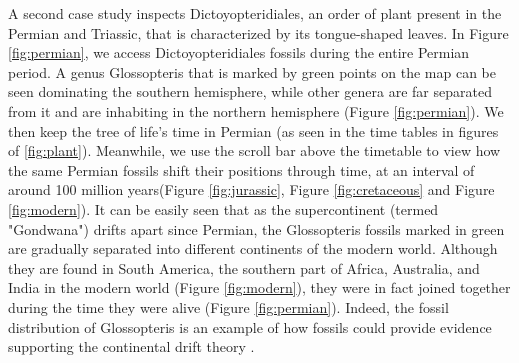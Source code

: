 \documentclass[11pt, a4paper,oneside,chapterprefix=false]{scrbook}
\begin{document}
A second case study inspects Dictoyopteridiales, an order of plant present in the Permian and Triassic, that is characterized by its tongue-shaped leaves. In Figure \ref{fig:permian}, we access Dictoyopteridiales fossils during the entire Permian period. A genus Glossopteris that is marked by green points on the map can be seen dominating the southern hemisphere, while other genera are far separated from it and are inhabiting in the northern hemisphere (Figure \ref{fig:permian}). We then keep the tree of life's time in Permian (as seen in the time tables in figures of \ref{fig:plant}). Meanwhile, we use the scroll bar above the timetable to view how the same Permian fossils shift their positions through time, at an interval of around 100 million years(Figure \ref{fig:jurassic}, Figure \ref{fig:cretaceous} and Figure \ref{fig:modern}). It can be easily seen that as the supercontinent (termed "Gondwana") drifts apart since Permian, the Glossopteris fossils marked in green are gradually separated into different continents of the modern world. Although they are found in South America, the southern part of Africa, Australia, and India in the modern world (Figure \ref{fig:modern}), they were in fact joined together during the time they were alive (Figure \ref{fig:permian}). Indeed, the fossil distribution of Glossopteris is an example of how fossils could provide evidence supporting the continental drift theory \cite{schopf1970relation}. 
\end{document}
